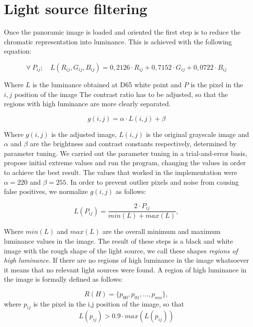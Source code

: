 \section{Light source filtering}
Once the panoramic image is loaded and oriented the first step is to reduce the chromatic representation into luminance. This is achieved with the following equation:

\begin{equation}
  \forall \  P_{ij}; \quad L(R_{ij},G_{ij},B_{ij}) = 0,2126 \cdot R_{ij} + 0,7152 \cdot G_{ij} + 0,0722 \cdot B_{ij} 
\end{equation}

Where $L$ is the luminance obtained at D65 white point and $P$ is the pixel in the $i,j$ position of the image \newline
The contrast ratio has to be adjusted, so that the regions with high luminance are more clearly separated. 

\begin{equation}
     g(i,j) = \alpha \cdot L(i,j) + \beta
\end{equation}

Where $g(i,j)$ is the adjusted image, $L(i,j)$ is the original grayscale image and $\alpha$ and $\beta$ are the brightness and contrast constants respectively, determined by parameter tuning. We carried out the parameter tuning in a trial-and-error basis, propose initial extreme values and run the program, changing the values in order to achieve the best result. The values that worked in the implementation were $\alpha = 220$ and $\beta = 255$.
In order to prevent outlier pixels and noise from causing false positives, we normalize $g(i,j)$ as follows:

\begin{equation}
    L(P_{ij}) = \frac{ 2 \cdot P_{ij} }{min(L) + max(L)},
\end{equation}

Where $min(L)$ and $max(L)$ are the overall minimum and maximum luminance values in the image. 
\newline
The result of these steps is a black and white image with the rough shape of the light source, we call these shapes \emph{regions of high luminance}. If there are no regions of high luminance in the image whatsoever it means that no relevant light sources were found. A region of high luminance in the image is formally defined as follows:

\begin{equation}
    R(H) = \{p_{00}, p_{01}, ... , p_{mn}\},
\end{equation}
 where $p_{ij}$ is the pixel in the i,j position of the image, so that 
\[
    L(p_{ij}) > 0.9 \cdot max(L(p_{ij})) 
\]

